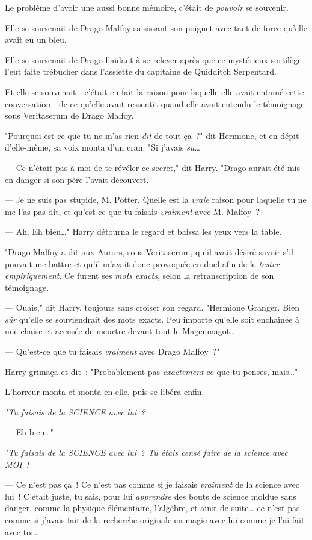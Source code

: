 Le problème d'avoir une aussi bonne mémoire, c'était de \emph{pouvoir} se souvenir.

Elle se souvenait de Drago Malfoy saisissant son poignet avec tant de force qu'elle avait eu un bleu.

Elle se souvenait de Drago l'aidant à se relever après que ce mystérieux sortilège l'eut faite trébucher dans l'assiette du capitaine de Quidditch Serpentard.

Et elle se souvenait - c'était en fait la raison pour laquelle elle avait entamé cette conversation - de ce qu'elle avait ressentit quand elle avait entendu le témoignage sous Veritaserum de Drago Malfoy.

"Pourquoi est-ce que tu ne m'as rien \emph{dit} de tout ça~?" dit Hermione, et en dépit d'elle-même, sa voix monta d'un cran. "Si j'avais \emph{su}…

--- Ce n'était pas à moi de te révéler ce secret," dit Harry. "Drago aurait été mis en danger si son père l'avait découvert.

--- Je ne suis pas stupide, M. Potter. Quelle est la \emph{vraie} raison pour laquelle tu ne me l'as pas dit, et qu'est-ce que tu faisais \emph{vraiment} avec M. Malfoy~?

--- Ah. Eh bien…" Harry détourna le regard et baissa les yeux vers la table.

"Drago Malfoy a dit aux Aurors, sous Veritaserum, qu'il avait désiré savoir s'il pouvait me battre et qu'il m'avait donc provoquée en duel afin de le \emph{tester empiriquement}. Ce furent ses \emph{mots exacts}, selon la retranscription de son témoignage.

--- Ouais," dit Harry, toujours sans croiser son regard. "Hermione Granger. Bien \emph{sûr} qu'elle se souviendrait des mots exacts. Peu importe qu'elle soit enchaînée à une chaise et accusée de meurtre devant tout le Magenmagot…

--- Qu'est-ce que tu faisais \emph{vraiment} avec Drago Malfoy~?"

Harry grimaça et dit~: "Probablement pas \emph{exactement} ce que tu penses, mais…"

L'horreur monta et monta en elle, puis se libéra enfin.

\emph{"Tu faisais de la SCIENCE avec lui~?}

--- Eh bien…"

\emph{"Tu faisais de la SCIENCE avec lui~? Tu étais censé faire de la science avec MOI~!}

--- Ce n'est pas ça~! Ce n'est pas comme si je faisais \emph{vraiment} de la science avec lui~! C'était juste, tu sais, pour lui \emph{apprendre} des bouts de science moldue sans danger, comme la physique élémentaire, l'algèbre, et ainsi de suite… ce n'est pas comme si j'avais fait de la recherche originale en magie avec lui comme je l'ai fait avec toi…

